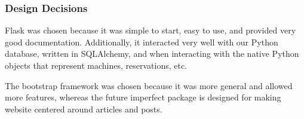 \documentclass[PPFS.tex]{template/subfiles}
\begin{document}
\subsubsection{Design Decisions}
Flask was chosen because it was simple to start, easy to use, and provided very good documentation. Additionally, it interacted very well with our Python database, written in SQLAlchemy, and when interacting with the native Python objects that represent machines, reservations, etc.

The bootstrap framework was chosen because it was more general and allowed more features, whereas the future imperfect package is designed for making website centered around articles and posts.
\end{document}
